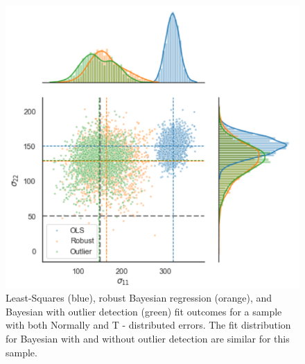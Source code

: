 \begin{figure}[H]
 	\centering
 	\includegraphics[width=1\textwidth]{chapters/chapter03/fig03/outlierS10.png}
 	\mycaption
 	{Least-Squares (blue), robust Bayesian regression (orange), and Bayesian with outlier detection (green) fit outcomes for a sample with both Normally and T - distributed errors. The fit distribution for Bayesian with and without outlier detection are similar for this sample.}
    \label{fig:RHP02}
 \end{figure}
